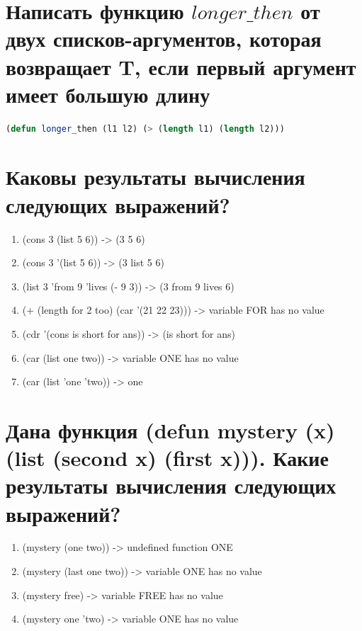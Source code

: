 \documentclass[12pt]{report}
\begin{document}
\section{Написать функцию $longer\_then$ от двух списков-аргументов, которая возвращает T, если первый аргумент имеет большую длину} 

\begin{lstlisting}[language=Lisp]
(defun longer_then (l1 l2) (> (length l1) (length l2)))
\end{lstlisting}


\section{Каковы результаты вычисления следующих выражений?}

\begin{enumerate}
    \item (cons 3 (list 5 6)) -> (3 5 6)

    \item (cons 3 '(list 5 6)) -> (3 list 5 6)

    \item (list 3 'from 9 'lives (- 9 3)) -> (3 from 9 lives 6)

    \item (+ (length for 2 too) (car '(21 22 23))) -> variable FOR has no value

    \item (cdr '(cons is short for ans)) -> (is short for ans)

    \item (car (list one two)) -> variable ONE has no value

    \item (car (list 'one 'two)) -> one

\end{enumerate}


\section{Дана функция (defun mystery (x) (list (second x) (first x))). Какие результаты вычисления следующих выражений?}

\begin{enumerate}
    \item (mystery (one two)) -> undefined function ONE

    \item (mystery (last one two)) -> variable ONE has no value

    \item (mystery free) -> variable FREE has no value

    \item (mystery one 'two) -> variable ONE has no value

\end{enumerate}
\end{document}
